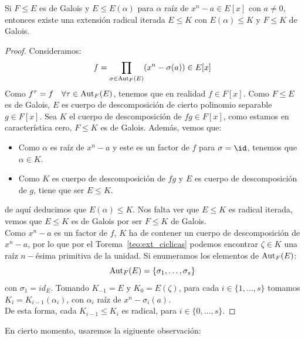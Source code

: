 \begin{prop}
    Si $F\leq E$ es de Galois y $E\leq E(\alpha)$ para $\alpha$ raíz de $x^n-a\in E[x]$ con $a\neq 0$, entonces existe una extensión radical iterada $E\leq K$ con $E(\alpha)\leq K$ y $F\leq K$ de Galois.
    \begin{proof}
        Consideramos:
        \begin{equation*}
            f = \prod_{\sigma\in \operatorname{Aut}_F(E)} (x^n-\sigma(a)) \in E[x]
        \end{equation*}
        Como $f^\tau = f\quad \forall \tau\in \operatorname{Aut}_F(E)$, tenemos que en realidad $f\in F[x]$. Como $F\leq E$ es de Galois, $E$ es cuerpo de descomposición de cierto polinomio separable $g\in F[x]$. Sea $K$ el cuerpo de descomposición de $fg\in F[x]$, como estamos en característica cero, $F\leq K$ es de Galois. Además, vemos que:
        \begin{itemize}
            \item Como $\alpha$ es raíz de $x^n-a$ y este es un factor de $f$ para $\sigma = \id$, tenemos que $\alpha\in K$.
            \item Como $K$ es cuerpo de descomposición de $fg$ y $E$ es cuerpo de descomposición de $g$, tiene que ser $E\leq K$.
        \end{itemize}
        de aquí deducimos que $E(\alpha)\leq K$. Nos falta ver que $E\leq K$ es radical iterada, vemos que $E\leq K$ es de Galois por ser $F\leq K$ de Galois. \\

        \noindent
        Como $x^n-a$ es un factor de $f$, $K$ ha de contener un cuerpo de descomposición de $x^n-a$, por lo que por el Torema~\ref{teo:ext_ciclicas} podemos encontrar $\zeta\in K$ una raíz $n-$ésima primitiva de la unidad. Si enumeramos los elementos de $\operatorname{Aut}_F(E)$:
        \begin{equation*}
            \operatorname{Aut}_F(E) = \{\sigma_1, \ldots, \sigma_s\}
        \end{equation*}
        con $\sigma_1 = id_E$. Tomando $K_{-1} = E$ y $K_0 = E(\zeta)$, para cada $i \in \{1,\ldots,s\}$ tomamos $K_i = K_{i-1}(\alpha_i)$, con $\alpha_i$ raíz de $x^{n}-\sigma_i(a)$.\\

        \noindent
        De esta forma, cada $K_{i-1}\leq K_i$ es radical, para $i \in \{0,\ldots,s\}$.
    \end{proof}
\end{prop}

\noindent
En cierto momento, usaremos la sigiuente observación:

